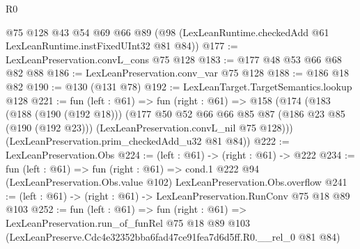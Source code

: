 \begin{lexlean}{R0}
\begin{coremodule}
    @75
    @128
    @43
    @54
    @69
    @66
    @89
    (@98 (LexLeanRuntime.checkedAdd @61 LexLeanRuntime.instFixedUInt32 @81 @84))
@177 := LexLeanPreservation.convL_cons @75 @128
@183 := @177 @48 @53 @66 @68 @82 @88
@186 := LexLeanPreservation.conv_var @75 @128
@188 := @186 @18 @82
@190 := @130 (@131 @78)
@192 := LexLeanTarget.TargetSemantics.lookup @128
@221 := fun (left : @61) =>
  fun (right : @61) =>
  @158
    (@174
      (@183
        (@188 (@190 (@192 @18)))
        (@177
          @50
          @52
          @66
          @66
          @85
          @87
          (@186 @23 @85 (@190 (@192 @23)))
          (LexLeanPreservation.convL_nil @75 @128)))
      (LexLeanPreservation.prim_checkedAdd_u32 @81 @84))
@222 := LexLeanPreservation.Obs
@224 := (left : @61) -> (right : @61) -> @222
@234 := fun (left : @61) =>
  fun (right : @61) =>
  cond.{1} @222 @94 (LexLeanPreservation.Obs.value @102) LexLeanPreservation.Obs.overflow
@241 := (left : @61) -> (right : @61) -> LexLeanPreservation.RunConv @75 @18 @89 @103
@252 := fun (left : @61) =>
  fun (right : @61) =>
  LexLeanPreservation.run_of_funRel
    @75
    @18
    @89
    @103
    (LexLeanPreserve.Cdc4e32352bba6fad47ce91fea7d6d5ff.R0.__rel_0 @81 @84)
\end{coremodule}
\end{lexlean}

